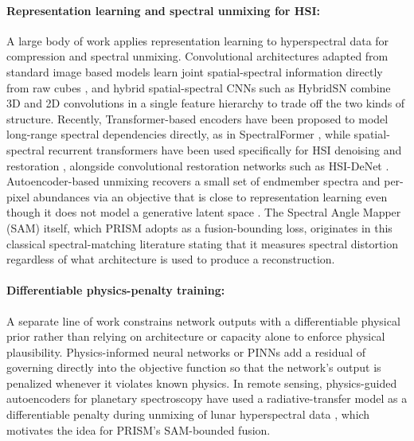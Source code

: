 \documentclass[twoside,11pt]{article}
\begin{document}
\paragraph{Representation learning and spectral unmixing for HSI:}
A large body of work applies representation learning to hyperspectral data for compression and spectral unmixing. Convolutional architectures adapted from standard image based models learn joint spatial-spectral information directly from raw cubes \citep{chen2016deep}, and hybrid spatial-spectral CNNs such as HybridSN \citep{roy2020hybridsn} combine 3D and 2D convolutions in a single feature hierarchy to trade off the two kinds of structure. Recently, Transformer-based encoders have been proposed to model long-range spectral dependencies directly, as in SpectralFormer \citep{hong2022spectralformer}, while spatial-spectral recurrent transformers have been used specifically for HSI denoising and restoration \citep{fu2024sst}, alongside convolutional restoration networks such as HSI-DeNet \citep{chang2019hsidenet}. Autoencoder-based unmixing recovers a small set of endmember spectra and per-pixel abundances via an objective that is close to representation learning even though it does not model a generative latent space \citep{su2019daen,palsson2018unmixing}. The Spectral Angle Mapper (SAM) itself, which PRISM adopts as a fusion-bounding loss, originates in this classical spectral-matching literature \citep{kruse1993sips} stating that it measures spectral distortion regardless of what architecture is used to produce a reconstruction.

\paragraph{Differentiable physics-penalty training:}
A separate line of work constrains network outputs with a differentiable physical prior rather than relying on architecture or capacity alone to enforce physical plausibility. Physics-informed neural networks or PINNs \citep{raissi2019pinn} add a residual of governing directly into the objective function so that the network's output is penalized whenever it violates known physics. In remote sensing, physics-guided autoencoders for planetary spectroscopy have used a radiative-transfer model as a differentiable penalty during unmixing of lunar hyperspectral data \citep{lin2026hapke}, which motivates the idea for PRISM's SAM-bounded fusion.
\end{document}
